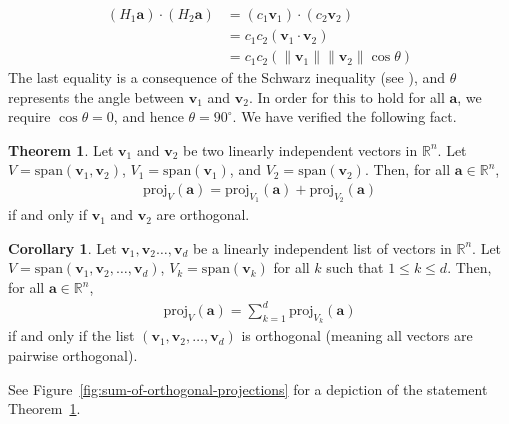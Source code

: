 \documentclass[12pt, a4paper]{article}
\theoremstyle{definition}
\newtheorem{theorem}{Theorem}
\newtheorem{corollary}{Corollary}
\begin{document}
	\begin{align*}
		(H_1\mathbf{a})\cdot (H_2\mathbf{a}) &= (c_1\mathbf{v}_1)\cdot(c_2\mathbf{v}_2)\\
		&=c_1c_2(\mathbf{v}_1\cdot\mathbf{v}_2)\\
		&=c_1c_2(\|\mathbf{v}_1\| \|\mathbf{v}_2\|\cos\theta)
	\end{align*}
	The last equality is a consequence of the Schwarz inequality (see \cite{axler}), and
	$\theta$ represents the angle between $\mathbf{v}_1$ and $\mathbf{v}_2$.
	In order for this to hold for all $\mathbf{a}$, we require $\cos\theta=0$,
	and hence $\theta=90^\circ$. We have verified the following fact.
	\begin{tcolorbox}[breakable]
		\begin{theorem}
			\label{thm:sum-of-orth-projs}
			Let $\mathbf{v}_1$ and $\mathbf{v}_2$ be two linearly independent vectors
			in $\mathbb{R}^n$. Let $V=\text{span}(\mathbf{v}_1, \mathbf{v}_2)$,
			$V_1=\text{span}(\mathbf{v}_1)$, and $V_2=\text{span}(\mathbf{v}_2)$.
			Then, for all $\mathbf{a}\in\mathbb{R}^n$,
			\begin{align*}
				\text{proj}_V(\mathbf{a}) =
				\text{proj}_{V_1}(\mathbf{a}) + \text{proj}_{V_2}(\mathbf{a})
			\end{align*}
			if and only if $\mathbf{v}_1$ and $\mathbf{v}_2$ are orthogonal.
		\end{theorem}
	\end{tcolorbox}
	\begin{tcolorbox}[breakable]
		\begin{corollary}
			\label{corollary:sum-ortho-projs}
			Let $\mathbf{v}_1, \mathbf{v}_2\ldots,\mathbf{v}_d$ be a linearly independent list of vectors
			in $\mathbb{R}^n$. Let $V=\text{span}(\mathbf{v}_1, \mathbf{v}_2,\ldots,\mathbf{v}_d)$,
			$V_k=\text{span}(\mathbf{v}_k)$ for all $k$ such that $1\leq k\leq d$.
			Then, for all $\mathbf{a}\in\mathbb{R}^n$,
			\begin{align*}
				\text{proj}_V(\mathbf{a}) = \sum_{k=1}^{d}\text{proj}_{V_k}(\mathbf{a})
			\end{align*}
			if and only if the list $(\mathbf{v}_1,\mathbf{v}_2,\ldots,\mathbf{v}_d)$
			is orthogonal (meaning all vectors are pairwise orthogonal).
		\end{corollary}
	\end{tcolorbox}
	See Figure~\ref{fig:sum-of-orthogonal-projections} for a depiction of the statement
	Theorem~\ref{thm:sum-of-orth-projs}.
\end{document}
